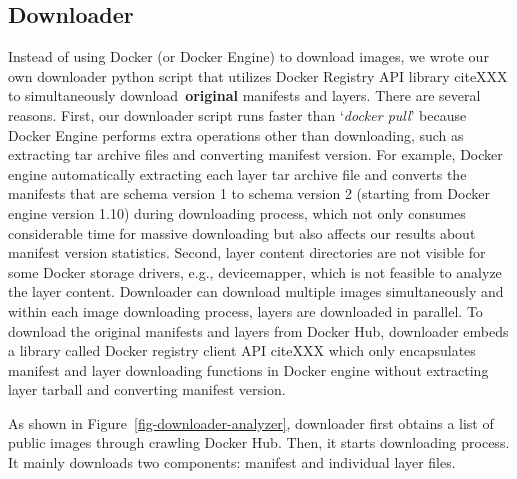 \subsection{Downloader}

Instead of using Docker (or Docker Engine) to download images, we wrote our own
downloader python script that utilizes Docker Registry API library citeXXX to
simultaneously download~\textbf{original} manifests and layers.
%
%
%
There are several reasons.
%
First, our downloader script runs faster than `\textit{docker pull}' because
Docker Engine performs extra operations other than downloading, such as extracting
tar archive files and converting manifest version. 
%
For example, Docker engine automatically extracting each layer tar archive file
and converts the manifests that are schema version 1 to schema version 2
(starting from Docker engine version 1.10) during downloading process, which
not only consumes considerable time for massive downloading but also affects
our results about manifest version statistics.
%
Second, layer content directories are not visible for some Docker storage
drivers, e.g., devicemapper, which is not feasible to analyze the layer
content. 
%
%
Downloader can download multiple images simultaneously and within each image
downloading process, layers are downloaded in parallel.
%
To download the original manifests and layers from Docker Hub, downloader
embeds a library called Docker registry client API citeXXX which only encapsulates
manifest and layer downloading functions in Docker engine without extracting layer
tarball and converting manifest version. 
%
%




%
As shown in Figure~\ref{fig-downloader-analyzer}, downloader first obtains a 
list of public images through crawling Docker Hub.
%
Then, it starts downloading process.
%
It mainly downloads two components: manifest and individual layer files. 



